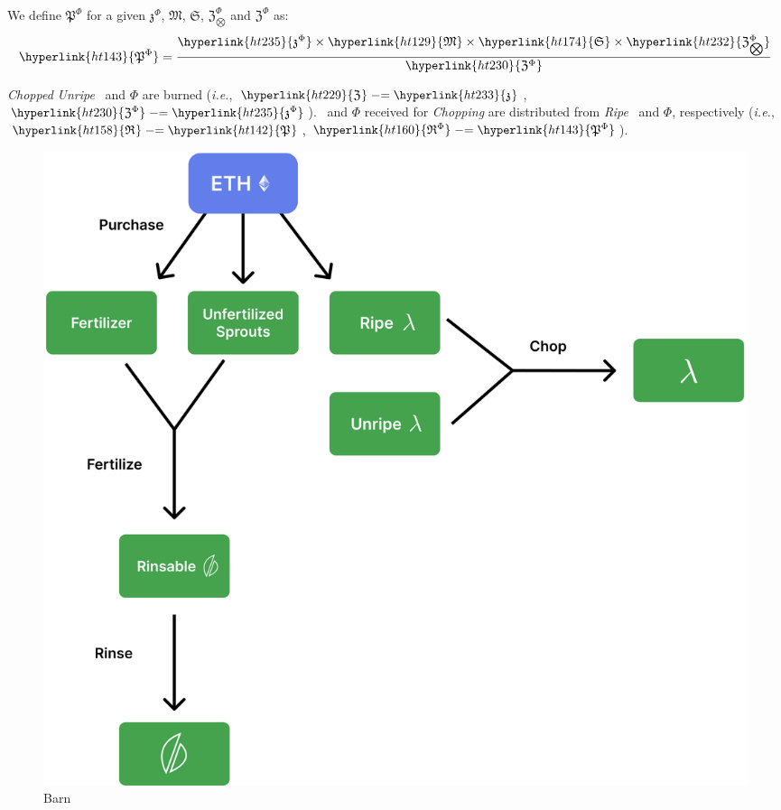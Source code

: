 \documentclass[tikz]{article}
\newcommand{\term}[1]{\textsl{#1}}
\newcommand{\Bean}{} %
\newcommand{\bean}{} %
\begin{document}
We define \hyperlink{ht143}{$\mathfrak{P}^{\Phi}$} for a given \hyperlink{ht235}{$\mathfrak{z}^{\Phi}$}, \hyperlink{ht129}{$\mathfrak{M}$}, \hyperlink{ht174}{$\mathfrak{S}$}, \hyperlink{ht232}{$\mathfrak{Z}_{\bigotimes}^{\Phi}$} and \hyperlink{ht230}{$\mathfrak{Z}^{\Phi}$} as:
$$\hyperlink{ht143}{\mathfrak{P}^{\Phi}} = \frac{\hyperlink{ht235}{\mathfrak{z}^{\Phi}} \times \hyperlink{ht129}{\mathfrak{M}} \times \hyperlink{ht174}{\mathfrak{S}} \times \hyperlink{ht232}{\mathfrak{Z}_{\bigotimes}^{\Phi}}}{\hyperlink{ht230}{\mathfrak{Z}^{\Phi}}}$$

\term{Chopped} \term{Unripe} \Bean\ and \hyperlink{ht187}{$\Phi$} are burned (\term{i.e.}, $\hyperlink{ht229}{\mathfrak{Z}^{\bean}} \mathrel{-}= \hyperlink{ht233}{\mathfrak{z}^{\bean}}$, $\hyperlink{ht230}{\mathfrak{Z}^{\Phi}} \mathrel{-}= \hyperlink{ht235}{\mathfrak{z}^{\Phi}}$). \Bean\ and \hyperlink{ht187}{$\Phi$} received for \term{Chopping} are distributed from \term{Ripe} \Bean\ and \hyperlink{ht187}{$\Phi$}, respectively (\term{i.e.}, $\hyperlink{ht158}{\mathfrak{R}^{\bean}} \mathrel{-}= \hyperlink{ht142}{\mathfrak{P}^{\bean}}$, $\hyperlink{ht160}{\mathfrak{R}^{\Phi}} \mathrel{-}= \hyperlink{ht143}{\mathfrak{P}^{\Phi}}$).

\begin{figure}[h!]
    \centering
    \includegraphics[scale=.155]{Figure3} %
    \vspace*{-5mm}
    \caption{Barn}
    \label{fig 3}
\end{figure}
\end{document}
